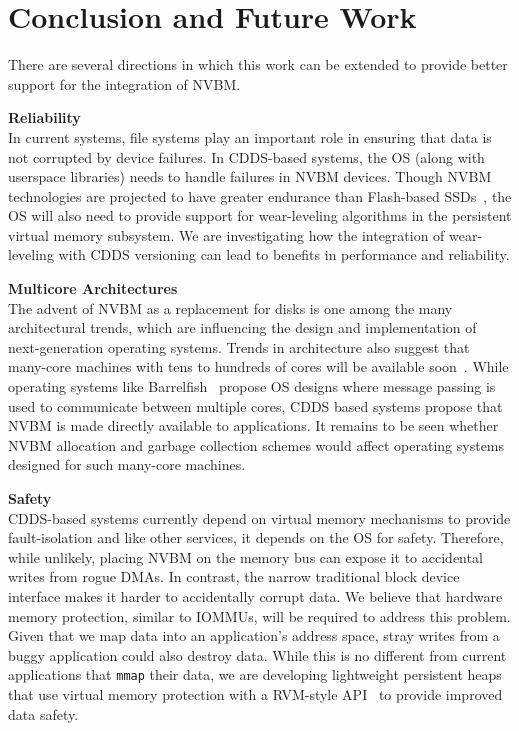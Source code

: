 \chapter{Conclusion and Future Work}
\label{sec:conclusion}
There are several directions in which this work can be extended to provide
better support for the integration of NVBM. 

\textbf{Reliability}\\
In current systems, file systems play an important role in ensuring that data is
not corrupted by device failures. In CDDS-based systems, the OS (along with
userspace libraries) needs to handle failures in NVBM devices.  Though NVBM
technologies are projected to have greater endurance than Flash-based
SSDs~\cite{Zhou09}, the OS will also need to provide support for wear-leveling
algorithms in the persistent virtual memory subsystem. We are investigating how
the integration of wear-leveling with CDDS versioning can lead to benefits in
performance and reliability. 

\textbf{Multicore Architectures}\\
The advent of NVBM as a replacement for disks is one among the many
architectural trends, which are influencing the design and implementation of
next-generation operating systems. Trends in architecture also suggest that
many-core machines with tens to hundreds of cores will be available
soon~\cite{Agarwal07}.  While operating systems like Barrelfish~\cite{Baumann09}
propose OS designs where message passing is used to communicate between
multiple cores, CDDS based systems propose that NVBM is made directly available
to applications.  It remains to be seen whether NVBM allocation and garbage
collection schemes would affect operating systems~\cite{Boyd-Wickizer08}
designed for such many-core machines.

\textbf{Safety}\\
CDDS-based systems currently depend on virtual memory mechanisms to
provide fault-isolation and like other services, it depends on the OS
for safety.  Therefore, while unlikely, placing NVBM
on the memory bus can expose it to accidental writes from rogue DMAs.
In contrast, the narrow traditional block device interface makes it
harder to accidentally corrupt data.  We believe that hardware memory
protection, similar to IOMMUs, will be required to address this
problem.  Given that we map data into an application's address space,
stray writes from a buggy application could also destroy data.  While
this is no different from current applications that \texttt{mmap}
their data, we are developing lightweight persistent heaps that use
virtual memory protection with a RVM-style
API~\citep{Satyanarayanan94} to provide improved data safety.

